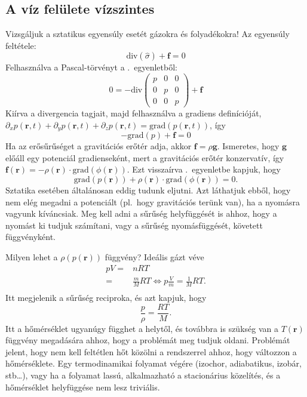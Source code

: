 \documentclass[12pt,a4paper]{scrartcl}
\let\mathbf\bm
\begin{document}
\subsection{A víz felülete vízszintes}
Vizsgáljuk a sztatikus egyensúly esetét gázokra és folyadékokra! Az egyensúly feltétele:
\[{\text{div}}\left( \hat \sigma  \right) + {\mathbf{f}} = 0\]
Felhasználva a Pascal-törvényt a .\ egyenletből:
\[0 =  - {\text{div}}\left( {\begin{array}{*{20}{c}}
  p&0&0 \\ 
  0&p&0 \\ 
  0&0&p 
\end{array}} \right) + {\mathbf{f}}\]
Kiírva a divergencia tagjait, majd felhasználva a gradiens definícióját, ${\partial _x}p\left( {{\mathbf{r}},t} \right) + {\partial _y}p\left( {{\mathbf{r}},t} \right) + {\partial _z}p\left( {{\mathbf{r}},t} \right) = {\text{grad}}\left( {p\left( {{\mathbf{r}},t} \right)} \right)$, így 
\begin{equation} \label{eq:stacionarius}
 - {\text{grad}}\left( p \right) + {\mathbf{f}} = 0
\end{equation}
Ha az erősűrűséget a gravitációs erőtér adja, akkor ${\mathbf{f}} = \rho {\mathbf{g}}$. Ismeretes, hogy ${\mathbf{g}}$ előáll egy potenciál gradienseként, mert a gravitációs erőtér konzervatív, így ${\mathbf{f}}\left( {\mathbf{r}} \right) =  - \rho \left( {\mathbf{r}} \right) \cdot {\text{grad}}\left( {\phi \left( {\mathbf{r}} \right)} \right)$. Ezt visszaírva .\ egyenletbe kapjuk, hogy
\begin{equation} \label{eq:stac_pot}
 {\text{grad}}\left( {p\left( {\mathbf{r}} \right)} \right) + \rho \left( {\mathbf{r}} \right) \cdot {\text{grad}}\left( {\phi \left( {\mathbf{r}} \right)} \right) = 0.
\end{equation}
Sztatika esetében általánosan eddig tudunk eljutni. Azt láthatjuk ebből, hogy nem elég megadni a potenciált (pl.\ hogy gravitációs terünk van), ha a nyomásra vagyunk kíváncsiak. Meg kell adni a sűrűség helyfüggését is ahhoz, hogy a nyomást ki tudjuk számítani, vagy a sűrűség nyomásfüggését, követett függvényként.

\footnotesize
Milyen lehet a $\rho \left( {p\left( {\mathbf{r}} \right)} \right)$ függvény? Ideális gázt véve
\[\begin{aligned}
  pV =  & nRT \\ 
   =  & \frac{m}{M}RT \Leftrightarrow p\frac{V}{m} = \frac{1}{M}RT. \\ 
\end{aligned} \]
Itt megjelenik a sűrűség reciproka, és azt kapjuk, hogy
\[\frac{p}{\rho } = \frac{{RT}}{M}.\]
Itt a hőmérséklet ugyanúgy függhet a helytől, és továbbra is szükség van a $T\left( {\mathbf{r}} \right)$ függvény megadására ahhoz, hogy a problémát meg tudjuk oldani. Problémát jelent, hogy nem kell feltétlen hőt közölni a rendszerrel ahhoz, hogy változzon a hőmérséklete. Egy termodinamikai folyamat végére (izochor, adiabatikus, izobár, stb\ldots), vagy ha a folyamat lassú, alkalmazható a stacionárius közelítés, és a hőmérséklet helyfüggése nem lesz triviális.
\end{document}
